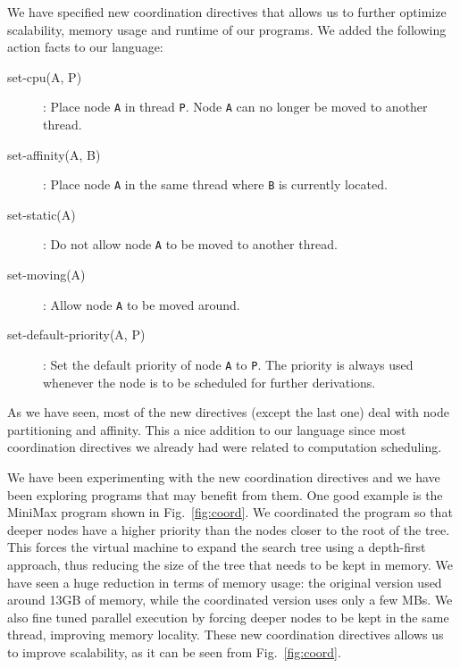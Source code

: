 \documentclass[10pt]{article}
\begin{document}
We have specified new coordination directives that allows us to further
optimize scalability, memory usage and runtime of our programs. We added the
following action facts to our language:

\begin{description}
   \item[set-cpu(A, P)]: Place node \texttt{A} in thread \texttt{P}. Node
   \texttt{A} can no longer be moved to another thread.
   \item[set-affinity(A, B)]: Place node \texttt{A} in the same thread where
   \texttt{B} is currently located.
   \item[set-static(A)]: Do not allow node \texttt{A} to be moved to another
   thread.
   \item[set-moving(A)]: Allow node \texttt{A} to be moved around.
   \item[set-default-priority(A, P)]: Set the default priority of node
   \texttt{A} to \texttt{P}. The priority is always used whenever the node is to
   be scheduled for further derivations.
\end{description}

As we have seen, most of the new directives (except the last one) deal with node
partitioning and affinity. This a nice addition to our language since most
coordination directives we already had were related to computation scheduling.

We have been experimenting with the new coordination directives and we have been
exploring programs that may benefit from them. One good example is the MiniMax
program shown in Fig.~\ref{fig:coord}. We coordinated the program so that deeper
nodes have a higher priority than the nodes closer to the root of the tree. This
forces the virtual machine to expand the search tree using a depth-first
approach, thus reducing the size of the tree that needs to be kept in memory. We
have seen a huge reduction in terms of memory usage: the original version used
around 13GB of memory, while the coordinated version uses only a few MBs. We
also fine tuned parallel execution by forcing deeper nodes to be kept in the
same thread, improving memory locality. These new coordination directives allows
us to improve scalability, as it can be seen from Fig.~\ref{fig:coord}.
\end{document}
